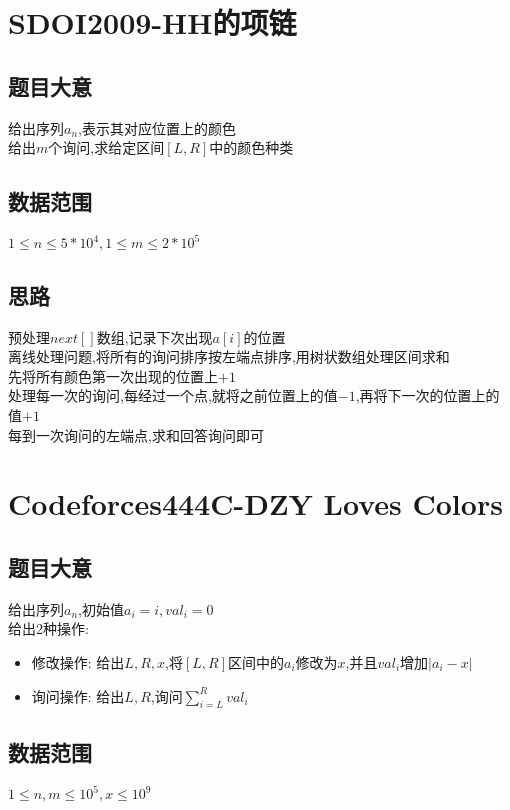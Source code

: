\documentclass{ctexart}
\numberwithin{equation}{section}
\begin{document}
\begin{flushleft}
  \section{SDOI2009-HH的项链}
  \subsection{题目大意}
  给出序列${a_n}$,表示其对应位置上的颜色 \\
  给出$m$个询问,求给定区间$[L,R]$中的颜色种类 \\
  \subsection{数据范围}
  $1\le n\le 5*10^4, 1 \le m \le 2*10^5$ \\
  \subsection{思路}
  预处理$next[]$数组,记录下次出现$a[i]$的位置 \\
  离线处理问题,将所有的询问排序按左端点排序,用树状数组处理区间求和\\
  先将所有颜色第一次出现的位置上$+1$\\
  处理每一次的询问,每经过一个点,就将之前位置上的值$-1$,再将下一次的位置上的值$+1$ \\
  每到一次询问的左端点,求和回答询问即可 \\
  \newpage

  \section{Codeforces444C-DZY Loves Colors}
  \subsection{题目大意}
  给出序列${a_n}$,初始值$a_i=i,val_i=0$ \\
  给出$2$种操作: \\
  \begin{itemize}
  \item 修改操作: 给出$L,R,x$,将$[L,R]$区间中的$a_i$修改为$x$,并且$val_i$增加$|a_i-x|$ \\
  \item 询问操作: 给出$L,R$,询问$\sum_{i=L}^{R}val_i$\\
  \end{itemize}

  \subsection{数据范围}
  $1\le n,m\le 10^5, x \le 10^9$ \\

\end{flushleft}
\end{document}
